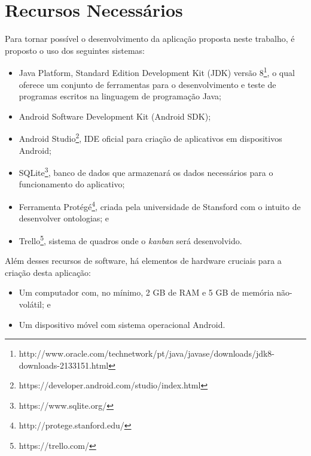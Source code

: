 \chapter{\label{chap:recurs}Recursos Necessários}
Para tornar possível o desenvolvimento da aplicação proposta neste trabalho, é proposto o uso dos seguintes sistemas:
\begin{itemize}
    \item Java Platform, Standard Edition Development Kit (JDK) versão 8\footnote{http://www.oracle.com/technetwork/pt/java/javase/downloads/jdk8-downloads-2133151.html}, o qual oferece um conjunto de ferramentas para o desenvolvimento e teste de programas escritos na linguagem de programação Java;
    \item Android Software Development Kit (Android SDK);
    \item Android Studio\footnote{https://developer.android.com/studio/index.html}, IDE oficial para criação de aplicativos em dispositivos Android;
    \item SQLite\footnote{https://www.sqlite.org/}, banco de dados que armazenará os dados necessários para o funcionamento do aplicativo;
    \item Ferramenta Protégé\footnote{http://protege.stanford.edu/}, criada pela universidade de Stansford com o intuito de desenvolver ontologias; e
    \item Trello\footnote{https://trello.com/}, sistema de quadros onde o \emph{kanban} será desenvolvido.
\end{itemize}
Além desses recursos de software, há elementos de hardware cruciais para a criação desta aplicação:
    \begin{itemize}
        \item Um computador com, no mínimo, 2 GB de RAM e 5 GB de memória não-volátil; e
        \item Um dispositivo móvel com sistema operacional Android.
    \end{itemize}